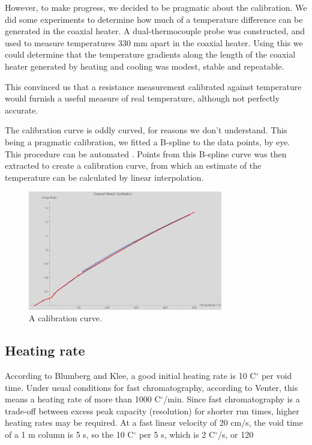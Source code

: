 \documentclass[aip,rsi,preprint,graphicx]{revtex4-1} %
\begin{document}
However, to make progress, we decided to be pragmatic about the calibration. We did some experiments to determine how much of a temperature difference can be generated in the coaxial heater. A dual-thermocouple probe was constructed, and used to measure temperatures 330 mm apart in the coaxial heater. Using this we could determine that the temperature gradients along the length of the coaxial heater generated by heating and cooling was modest, stable and repeatable. 


This convinced us that a resistance measurement calibrated against temperature would furnish a useful measure of real temperature, although not perfectly accurate. 

The calibration curve is oddly curved, for reasons we don't understand. This being a pragmatic calibration, we fitted a B-spline to the data points, by eye. This procedure can be automated \cite{WenniZheng2012}. Points from this B-spline curve was then extracted to create a calibration curve, from which an estimate of the temperature can be calculated by linear interpolation. 

\begin{figure}
\includegraphics[width=8.5cm]{2015_04_24_Calibration}%
\caption{\label{TempCal}A calibration curve.}%
\end{figure}

\subsection{Heating rate}

According to Blumberg and Klee, a good initial heating rate is 10 C$^\circ$ per void time. Under usual conditions for fast chromatography, according to Venter, this means a heating rate of more than 1000 C$^\circ$/min. Since fast chromatography is a trade-off between excess peak capacity (resolution) for shorter run times, higher heating rates may be required. At a fast linear velocity of 20 cm/s, the void time  of a 1 m column is 5 s, so the 10 C$^\circ$ per 5 s, which is 2 C$^\circ$/s, or 120
\end{document}
